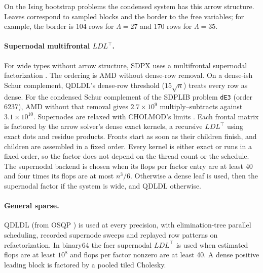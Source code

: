 \documentclass[11pt]{article}
\newcommand{\code}[1]{\texttt{#1}}
\begin{document}
On the Ising bootstrap problems the condensed system has this arrow
structure. Leaves correspond to sampled blocks and the border to the free
variables; for example, the border is 104 rows for $\Lambda=27$ and 170 rows
for $\Lambda=35$.

\paragraph{Supernodal multifrontal $LDL^\top$.}
For wide types without arrow structure, SDPX uses a multifrontal supernodal
factorization \cite{DuffReid1983}. The ordering is AMD
\cite{AmestoyDavisDuff1996} without dense-row removal. On a dense-ish Schur
complement, QDLDL's dense-row threshold ($15\sqrt n$) treats every row as dense.
For the condensed Schur complement of the SDPLIB problem \code{dE3} (order 6237),
AMD without that removal gives $2.7\times10^9$ multiply--subtracts against
$3.1\times10^{10}$. Supernodes are relaxed with CHOLMOD's limits
\cite{Chen2008CHOLMOD}. Each frontal matrix is factored by the arrow solver's
dense exact kernels, a recursive $LDL^\top$ using exact dots and residue
products. Fronts start as soon as their children finish, and children are
assembled in a fixed order. Every kernel is either exact or runs in a fixed
order, so the factor does not depend on the thread count or the schedule. The
supernodal backend is chosen when its flops per factor entry are at least 40
and four times its flops are at most $n^3/6$. Otherwise a dense leaf is used,
then the supernodal factor if the system is wide, and QDLDL otherwise.

\paragraph{General sparse.}
QDLDL (from OSQP \cite{Stellato2020}) is used at every precision, with
elimination-tree parallel scheduling, recorded supernode sweeps and replayed
row patterns on refactorization. In binary64 the faer supernodal $LDL^\top$
is used when estimated flops are at least $10^8$ and flops per factor nonzero
are at least 40. A dense positive leading block is factored by a pooled tiled
Cholesky.
\end{document}
